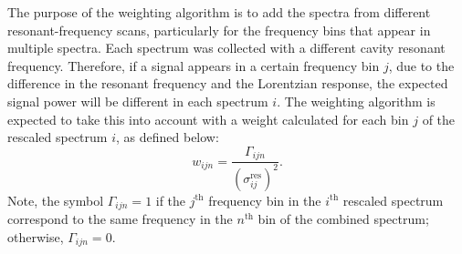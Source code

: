 



The purpose of the weighting algorithm is to add the spectra from different 
resonant-frequency scans,
 particularly for the frequency bins that appear in multiple spectra.  
Each spectrum was collected with a different cavity resonant frequency. 
Therefore, if a signal appears in a certain frequency bin $j$, due to the
 difference in the resonant frequency and the Lorentzian response, the 
expected signal
 power will be different in each spectrum $i$. The weighting algorithm is 
expected to take this into account with a weight calculated for each bin $j$ of
 the rescaled spectrum $i$, as defined below: %
\begin{equation}
    \label{eq:weight}
    {w_{ijn}} = \frac{\Gamma_{ijn}}{(\sigma_{ij}^\text{res})^{2}}.
\end{equation}
Note, the symbol $\Gamma_{ijn}=1$ if the $j^\text{th}$ frequency bin in the 
$i^\text{th}$ rescaled spectrum correspond to the same frequency in 
the $n^\text{th}$ bin of the combined spectrum; otherwise, $\Gamma_{ijn}=0$.

